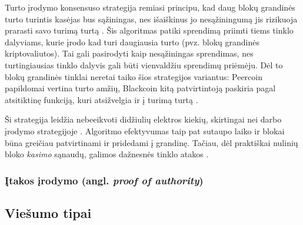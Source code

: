 Turto įrodymo konsensuso strategija remiasi principu, kad daug blokų grandinės turto turintis kasėjas
bus sąžiningas, nes išaiškinus jo nesąžiningumą jis rizikuoja prarasti savo turimą turtą \cite{Baars2016}. Šis algoritmas patiki sprendimą priimti
tiems tinklo dalyviams, kurie įrodo kad turi daugiausia turto (pvz. blokų grandinės kriptovaliutos). Tai gali pasirodyti kaip nesąžiningas sprendimas,
nes turtingiausias tinklo dalyvis gali būti vienvaldžiu sprendimų priėmėju. Dėl to blokų grandinės tinklai neretai taiko šios strategijos
variantus: Peercoin papildomai vertina turto amžių, Blackcoin kitą patvirtintoją paskiria pagal atsitiktinę funkciją, kuri atsižvelgia ir į turimą turtą \cite{Zheng2017}.

Ši strategija leidžia nebeeikvoti didžiulių elektros kiekių, skirtingai nei darbo įrodymo strategijoje \cite{Ethereum}. Algoritmo efektyvumas
taip pat sutaupo laiko ir blokai būna greičiau patvirtinami ir pridedami į grandinę. Tačiau, dėl praktiškai nulinių bloko \textit{kasimo} sąnaudų,
galimos dažnesnės tinklo atakos \cite{Zheng2017}. 

\subsubsection{Įtakos įrodymo (angl. \textit{proof of authority})}

\subsection{Viešumo tipai}

